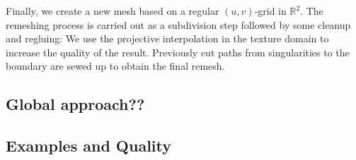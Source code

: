 Finally, we create a new mesh based on a regular $(u,v)$-grid in $\mathbb R^2$. 
The remeshing process is carried out as a subdivision step followed by some cleanup
and regluing: We use the projective interpolation in the texture domain to 
increase the quality of the result. Previously cut paths from singularities to the 
boundary are sewed up to obtain the final remesh.

\subsection{Global approach??}

\subsection{Examples and Quality}
\label{sub:examples_quality}


